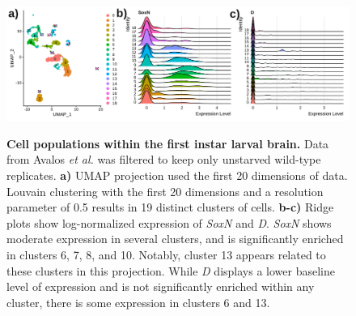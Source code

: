 \documentclass[withindex,glossary]{cam-thesis}
\begin{document}
\setcounter{figure}{12-1}
\begin{figure}[bhtp]
\centering
\includegraphics[width=\textwidth]{figs/Fig12 larval UMAP and ridges.png}
\label{fig12}
\caption{\textbf{Cell populations within the first instar larval brain.} Data from Avalos \emph{et al.} was filtered to keep only unstarved wild-type replicates. \textbf{a)} UMAP projection used the first 20 dimensions of data. Louvain clustering with the first 20 dimensions and a resolution parameter of 0.5 results in 19 distinct clusters of cells. \textbf{b-c)} Ridge plots show log-normalized expression of \emph{SoxN} and \emph{D}. \emph{SoxN} shows moderate expression in several clusters, and is significantly enriched in clusters 6, 7, 8, and 10. Notably, cluster 13 appears related to these clusters in this projection. While \emph{D} displays a lower baseline level of expression and is not significantly enriched within any cluster, there is some expression in clusters 6 and 13.}
\end{figure}
\end{document}
